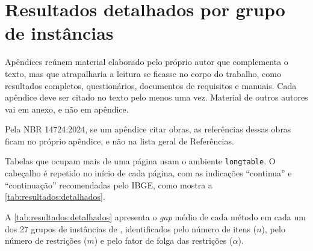 \chapter{Resultados detalhados por grupo de instâncias}
\label{ap:resultados}

\begin{instrucao}
Apêndices reúnem material elaborado pelo próprio autor que complementa o texto,
mas que atrapalharia a leitura se ficasse no corpo do trabalho, como
resultados completos, questionários, documentos de requisitos e manuais. Cada apêndice
deve ser citado no texto pelo menos uma vez. Material de outros autores vai em
anexo, e não em apêndice.

Pela NBR 14724:2024, se um apêndice citar obras, as referências dessas obras
ficam no próprio apêndice, e não na lista geral de Referências.

Tabelas que ocupam mais de uma página usam o ambiente \verb|longtable|. O
cabeçalho é repetido no início de cada página, com as indicações
``continua'' e ``continuação'' recomendadas pelo IBGE, como mostra a
\cref{tab:resultados:detalhados}.
\end{instrucao}

A \cref{tab:resultados:detalhados} apresenta o \emph{gap} médio de cada
método em cada um dos 27 grupos de instâncias de \textcite{chu1998genetic},
identificados pelo número de itens ($n$), pelo número de restrições ($m$) e
pelo fator de folga das restrições ($\alpha$).

